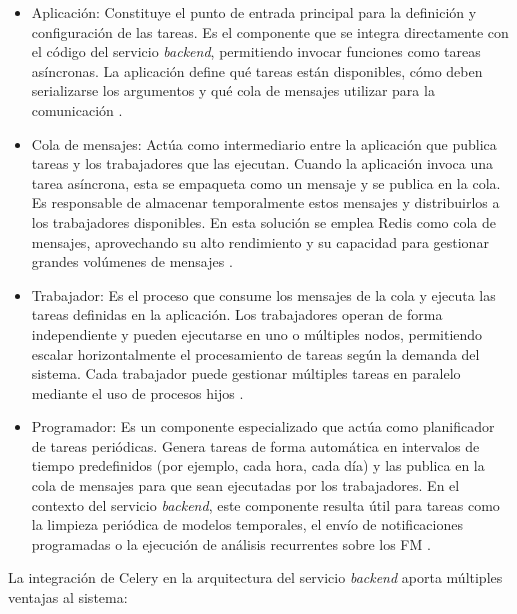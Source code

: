 \begin{itemize}
    \item Aplicación: Constituye el punto de entrada principal para la definición y configuración de las tareas. 
	Es el componente que se integra directamente con el código del servicio \textit{backend}, 
	permitiendo invocar funciones como tareas asíncronas. 
	La aplicación define qué tareas están disponibles, cómo deben serializarse los argumentos y qué cola de 
	mensajes utilizar para la comunicación \citep{celery2025firststeps}.
    
    \item Cola de mensajes: Actúa como intermediario entre la aplicación que publica tareas y 
	los trabajadores que las ejecutan. Cuando la aplicación invoca una tarea asíncrona, esta se empaqueta como 
	un mensaje y se publica en la cola. Es responsable de almacenar temporalmente estos mensajes y 
	distribuirlos a los trabajadores disponibles. En esta solución se emplea Redis como cola de mensajes, 
	aprovechando su alto rendimiento y su capacidad para gestionar grandes volúmenes de mensajes 
	\citep{celery2025redis}.
    
    \item Trabajador: Es el proceso que consume los mensajes de la cola y ejecuta las tareas 
	definidas en la aplicación. Los trabajadores operan de forma independiente y pueden ejecutarse en uno o 
	múltiples nodos, permitiendo escalar horizontalmente el procesamiento de tareas según la demanda del sistema. 
	Cada trabajador puede gestionar múltiples tareas en paralelo mediante el uso de procesos hijos \citep{celery2025workers}.
    
    \item Programador: Es un componente especializado que actúa como planificador de tareas 
	periódicas. Genera tareas de forma automática en intervalos de tiempo predefinidos 
	(por ejemplo, cada hora, cada día) y las publica en la cola de mensajes para que sean ejecutadas por los 
	trabajadores. En el contexto del servicio \textit{backend}, este componente resulta útil para tareas como la limpieza 
	periódica de modelos temporales, el envío de notificaciones programadas o la ejecución de análisis 
	recurrentes sobre los \ac{FM} \citep{celery2025beat}.
\end{itemize}

La integración de Celery en la arquitectura del servicio \textit{backend} aporta múltiples ventajas al sistema:

